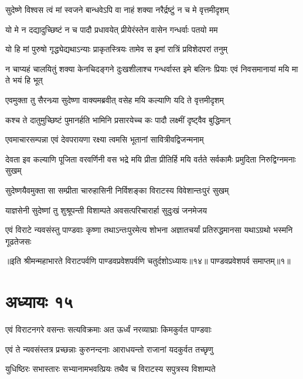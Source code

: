 \twolineshloka
{सुदेष्णे विश्वस त्वं मां स्वजने बान्धवेऽपि वा}
{नाहं शक्या नरैर्द्रष्टुं न च मे वृत्तमीदृशम्}


\twolineshloka
{यो मे न दद्यादुच्छिष्टं न च पादौ प्रधावयेत्}
{प्रीयेरंस्तेन वासेन गन्धर्वाः पतयो मम}


\twolineshloka
{यो हि मां पुरुषो गृद्ध्येद्यथाऽन्याः प्राकृतस्त्रियः}
{तामेव स इमां रात्रिं प्रविशेदपरां तनुम्}


\threelineshloka
{न चाप्यहं चालयितुं शक्या केनचिदङ्गने}
{दुःखशीलाश्च गन्धर्वास्त इमे बलिनः प्रियाः}
{एवं निवसमानायां मयि मा ते भयं हि भूत्}



\twolineshloka
{एवमुक्ता तु सैरन्ध्र्या सुदेष्णा वाक्यमब्रवीत्}
{वसेह मयि कल्याणि यदि ते वृत्तमीदृशम्}


\twolineshloka
{कश्च ते दातुमुच्छिष्टं पुमानर्हति भामिनि}
{प्रसारयेच्च कः पादौ लक्ष्मीं दृष्ट्वैव बुद्धिमान्}


\twolineshloka
{एवमाचारसम्पन्ना एवं देवपरायणा}
{रक्ष्या त्वमसि भूतानां सावित्रीवद्विजन्मनाम्}


\threelineshloka
{देवता इव कल्याणि पूजिता वरवर्णिनी}
{वस भद्रे मयि प्रीता प्रीतिर्हि मयि वर्तते}
{सर्वकामैः प्रमुदिता निरुद्विग्नमनाः सुखम्}



\twolineshloka
{सुदेष्णयैवमुक्ता सा सम्प्रीता चारुहासिनी}
{निर्विशङ्का विराटस्य विवेशान्तःपुरं सुखम्}


\twolineshloka
{याज्ञसेनी सुदेष्णां तु शुश्रूपन्ती विशाम्पते}
{अवसत्परिचारार्हा सुदुःखं जनमेजय}


\twolineshloka
{एवं विराटे न्यवसंस्तु पाण्डवाः कृष्णा तथाऽन्तःपुरमेत्य शोभना}
{अज्ञातचर्यां प्रतिरुद्धमानसा यथाऽग्रथो भस्मनि गूढतेजसः}

॥इति श्रीमन्महाभारते विराटपर्वणि पाण्डवप्रवेशपर्वणि चतुर्दशोऽध्यायः॥१४॥ पाण्डवप्रवेशपर्व समाप्तम्॥१॥

\chapter{अध्यायः १५}

\twolineshloka
{एवं विराटनगरे वसन्तः सत्यविक्रमाः}
{अत ऊर्ध्वं नरव्याघ्राः किमकुर्वत पाण्डवाः}



\twolineshloka
{एवं ते न्यवसंस्तत्र प्रच्छन्नाः कुरुनन्दनाः}
{आराधयन्तो राजानां यदकुर्वत तच्छृणु}


\twolineshloka
{युधिष्ठिरः सभास्तारः सभ्यानामभवत्प्रियः}
{तथैव च विराटस्य सपुत्रस्य विशाम्पते}


